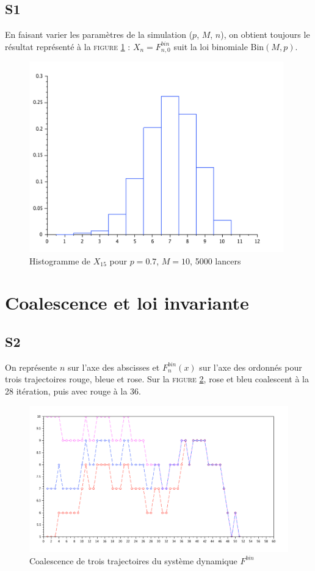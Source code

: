 \documentclass[a4paper,11pt]{article}
\begin{document}
\subsection*{S1}
En faisant varier les paramètres de la simulation ($p$, $M$, $n$), on obtient toujours le résultat représenté à la \textsc{figure} \ref{S1} : $X_n = F^{bin}_{n,0}$ suit la loi binomiale $\text{Bin}(M,p)$.
\begin{figure}[h]
\center
\includegraphics[width=11cm]{S1}
\caption{Histogramme de $X_{15}$ pour $p=0.7$, $M=10$, 5000 lancers}
\label{S1}

\end{figure}

\section{Coalescence et loi invariante}
\subsection*{S2}
On représente $n$ sur l'axe des abscisses et $F_n^{bin}(x)$ sur l'axe des ordonnés pour trois trajectoires rouge, bleue et rose. Sur la \textsc{figure} \ref{S2}, rose et bleu coalescent à la 28\ieme{} itération, puis avec rouge à la 36\ieme{}.
\begin{figure}[h]
\center
\includegraphics[width=15cm]{S2}
\caption{Coalescence de trois trajectoires du système dynamique $F^{bin}$}
\label{S2}

\end{figure}
\end{document}

